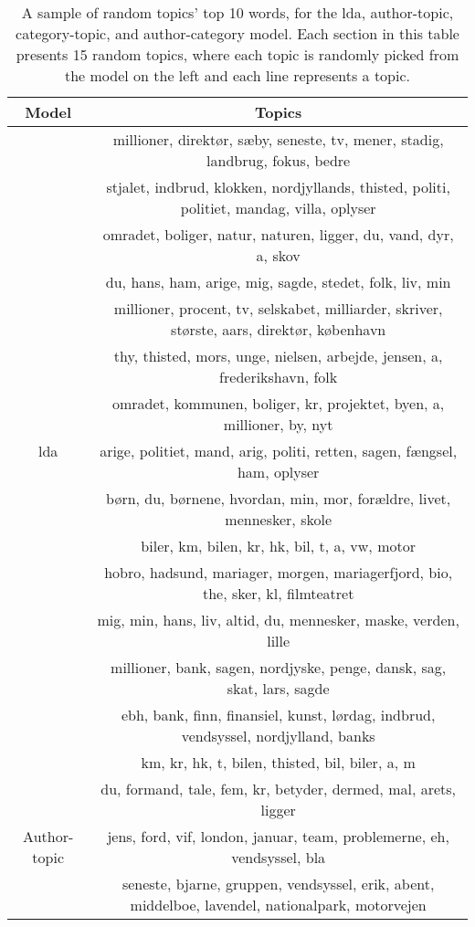 \begin{table}
	\caption{A sample of random topics' top 10 words, for the \gls{lda}, author-topic, category-topic, and author-category model. 
	Each section in this table presents 15 random topics, where each topic is randomly picked from the model on the left and each line represents a topic.}
	\label{tab:all_gibbs_topic_examples}
	\centering
	\begin{tabular}{c|c}
		Model & Topics \\
		\midrule
		\multirow{15}{*}{\gls{lda}} & millioner, direktør, sæby, seneste, tv, mener, stadig, landbrug, fokus, bedre \\
		& stjalet, indbrud, klokken, nordjyllands, thisted, politi, politiet, mandag, villa, oplyser \\
		& omradet, boliger, natur, naturen, ligger, du, vand, dyr, a, skov \\
		& du, hans, ham, arige, mig, sagde, stedet, folk, liv, min \\
		& millioner, procent, tv, selskabet, milliarder, skriver, største, aars, direktør, københavn \\
		& thy, thisted, mors, unge, nielsen, arbejde, jensen, a, frederikshavn, folk \\
		& omradet, kommunen, boliger, kr, projektet, byen, a, millioner, by, nyt \\
		& arige, politiet, mand, arig, politi, retten, sagen, fængsel, ham, oplyser \\
		& børn, du, børnene, hvordan, min, mor, forældre, livet, mennesker, skole \\
		& biler, km, bilen, kr, hk, bil, t, a, vw, motor \\
		& hobro, hadsund, mariager, morgen, mariagerfjord, bio, the, sker, kl, filmteatret \\
		& mig, min, hans, liv, altid, du, mennesker, maske, verden, lille \\
		& millioner, bank, sagen, nordjyske, penge, dansk, sag, skat, lars, sagde \\
		& ebh, bank, finn, finansiel, kunst, lørdag, indbrud, vendsyssel, nordjylland, banks \\
		& km, kr, hk, t, bilen, thisted, bil, biler, a, m \\
		\midrule
		\multirow{15}{*}{Author-topic} & du, formand, tale, fem, kr, betyder, dermed, mal, arets, ligger \\
		& jens, ford, vif, london, januar, team, problemerne, eh, vendsyssel, bla \\
		& seneste, bjarne, gruppen, vendsyssel, erik, abent, middelboe, lavendel, nationalpark, motorvejen \\

\end{tabular}
\end{table}
